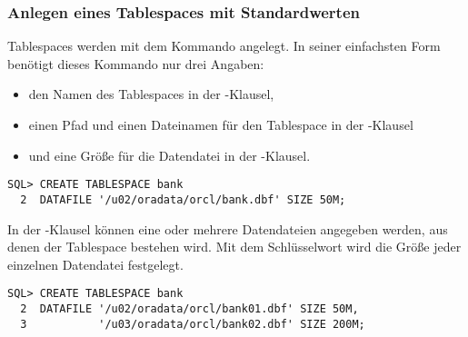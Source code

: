         \subsubsection{Anlegen eines Tablespaces mit Standardwerten}
          Tablespaces werden mit dem Kommando  angelegt. In seiner einfachsten Form benötigt dieses Kommando nur drei Angaben:
          \begin{itemize}
            \item den Namen des Tablespaces in der -Klausel,
            \item einen Pfad und einen Dateinamen für den Tablespace in der -Klausel
            \item und eine Größe für die Datendatei in der -Klausel.
          \end{itemize}
          \begin{lstlisting}[caption={Das \languageorasql{CREATE TABLESPACE}-Kommando},label=admin103,language=oracle_sql]
SQL> CREATE TABLESPACE bank
  2  DATAFILE '/u02/oradata/orcl/bank.dbf' SIZE 50M;
          \end{lstlisting}
          \begin{merke}
            In der -Klausel können eine oder mehrere Datendateien angegeben werden, aus denen der Tablespace bestehen wird. Mit dem Schlüsselwort  wird die Größe jeder einzelnen Datendatei festgelegt.
          \end{merke}
          \begin{lstlisting}[caption={Ein Tablespace mit mehreren Datendateien},label=admin104,language=oracle_sql]
SQL> CREATE TABLESPACE bank
  2  DATAFILE '/u02/oradata/orcl/bank01.dbf' SIZE 50M,
  3           '/u03/oradata/orcl/bank02.dbf' SIZE 200M;
          \end{lstlisting}
